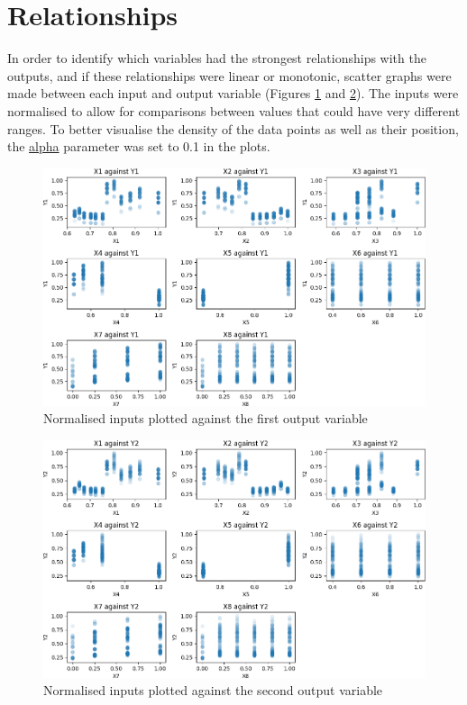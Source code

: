\documentclass[12pt]{article}
\begin{document}
\FloatBarrier

\section{Relationships}

In order to identify which variables had the strongest relationships with the outputs, and if these relationships were linear or monotonic, scatter graphs were made between each input and output variable (Figures \ref{fig:xvsy0} and \ref{fig:xvsy1}). The inputs were normalised to allow for comparisons between values that could have very different ranges. To better visualise the density of the data points as well as their position, the \url{alpha} parameter was set to 0.1 in the plots. 

\begin{figure}[!ht]
\centering
\includegraphics[width=0.8 \linewidth]{images/XsVsY0}
\caption{Normalised inputs plotted against the first output variable}
\label{fig:xvsy0}
\end{figure}

\begin{figure}[!ht]
\centering
\includegraphics[width=0.8 \linewidth]{images/XsVsY1}
\caption{Normalised inputs plotted against the second output variable}
\label{fig:xvsy1}
\end{figure}
\end{document}
